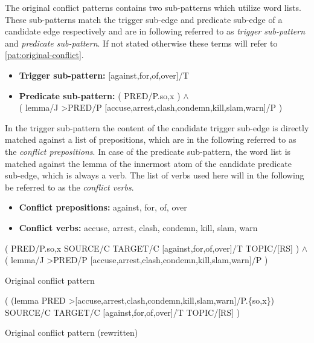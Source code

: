 \documentclass[11pt]{scrreprt}
\begin{document}
The original conflict patterns contains two sub-patterns which utilize word lists. These sub-patterns match the trigger sub-edge and predicate sub-edge of a candidate edge respectively and are in following referred to as \textit{trigger sub-pattern} and \textit{predicate sub-pattern}. If not stated otherwise these terms will refer to \cref{pat:original-conflict}. 

\begin{itemize}
	\item \textbf{\textsf{Trigger sub-pattern:}} \textsf{[against,for,of,over]/T}
	\item \textbf{\textsf{Predicate sub-pattern:}}
		\textsf{( PRED/P.{so,x} ) \(\wedge\) \\ ( lemma/J >PRED/P [accuse,arrest,clash,condemn,kill,slam,warn]/P )}
\end{itemize}

In the trigger sub-pattern the content of the candidate trigger sub-edge is directly matched against a list of prepositions, which are in the following referred to as the \textit{conflict prepositions}. In case of the predicate sub-pattern, the word list is matched against the lemma of the innermost atom of the candidate predicate sub-edge, which is always a verb. The list of verbs used here will in the following be referred to as the \textit{conflict verbs}.

\begin{itemize}
	\item \textbf{\textsf{Conflict prepositions:}} against, for, of, over
	\item \textbf{\textsf{Conflict verbs:}} accuse, arrest, clash, condemn, kill, slam, warn
\end{itemize}


\begin{pattern}
  \normalfont\sffamily
  \centering
  ( PRED/P.{so,x} SOURCE/C TARGET/C [against,for,of,over]/T TOPIC/[RS] ) \(\wedge\) \\
  ( lemma/J >PRED/P [accuse,arrest,clash,condemn,kill,slam,warn]/P )
  \caption{Original conflict pattern}
  \label{pat:original-conflict}
\end{pattern}

\begin{pattern}
  \normalfont\sffamily
  \centering
  ( (lemma PRED >[accuse,arrest,clash,condemn,kill,slam,warn]/P.\{so,x\}) \\
  SOURCE/C TARGET/C [against,for,of,over]/T TOPIC/[RS] ) 

  \caption{Original conflict pattern (rewritten)}
  \label{pat:original-conflict-rewritten}
\end{pattern}
\end{document}
